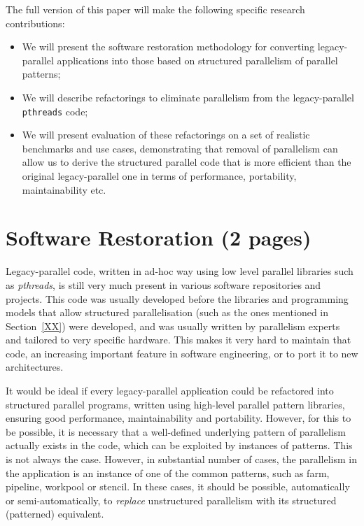\documentclass{llncs}
\begin{document}
The full version of this paper will make the following specific research contributions:
\begin{itemize}
    \item We will present the software restoration methodology for converting legacy-parallel applications into those based on structured parallelism of parallel patterns;
    \item We will describe refactorings to eliminate parallelism from the legacy-parallel \lstinline{pthreads} code;
    \item We will present evaluation of these refactorings on a set of realistic benchmarks and use cases, demonstrating that removal of parallelism can allow us to derive the structured parallel code that is more efficient than the original legacy-parallel one in terms of performance, portability, maintainability etc.
\end{itemize}

\section{Software Restoration (2 pages)} \label{sec:softRest}

Legacy-parallel code, written in ad-hoc way using low level parallel libraries such as \emph{pthreads}, is still very much present in various software repositories and projects. This code was usually developed before the libraries and programming models that allow structured parallelisation (such as the ones mentioned in Section~\ref{XX}) were developed, and was usually written by parallelism experts and tailored to very specific hardware. This makes it very hard to maintain that code, an increasing important feature in software engineering, or to port it to new architectures. 

It would be ideal if every legacy-parallel application could be refactored into structured parallel programs, written using high-level parallel pattern libraries, ensuring good performance, maintainability and portability. However, for this to be possible, it is necessary that a well-defined underlying pattern of parallelism actually exists in the code, which can be exploited by instances of patterns. This is not always the case. However, in substantial number of cases, the parallelism in the application is an instance of one of the common patterns, such as farm, pipeline, workpool or stencil. In these cases, it should be possible, automatically or semi-automatically, to \emph{replace} unstructured parallelism with its structured (patterned) equivalent.   
\end{document}
